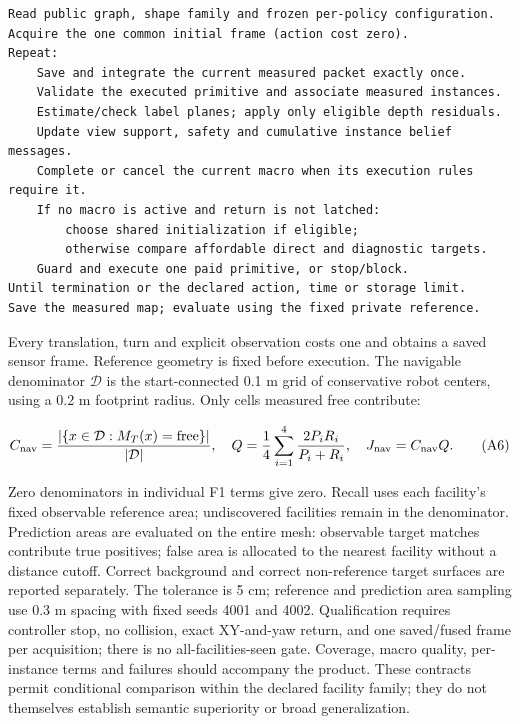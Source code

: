 \documentclass[11pt,a4paper]{article}
\begin{document}
\par\noindent\begin{minipage}{\linewidth}
\small
\begin{verbatim}
Read public graph, shape family and frozen per-policy configuration.
Acquire the one common initial frame (action cost zero).
Repeat:
    Save and integrate the current measured packet exactly once.
    Validate the executed primitive and associate measured instances.
    Estimate/check label planes; apply only eligible depth residuals.
    Update view support, safety and cumulative instance belief messages.
    Complete or cancel the current macro when its execution rules require it.
    If no macro is active and return is not latched:
        choose shared initialization if eligible;
        otherwise compare affordable direct and diagnostic targets.
    Guard and execute one paid primitive, or stop/block.
Until termination or the declared action, time or storage limit.
Save the measured map; evaluate using the fixed private reference.
\end{verbatim}
\end{minipage}\par

Every translation, turn and explicit observation costs one and obtains a saved sensor frame. Reference geometry is fixed before execution. The navigable denominator \(\mathcal D\) is the start-connected 0.1 m grid of conservative robot centers, using a 0.2 m footprint radius. Only cells measured free contribute:

\[
C_{\rm nav}=\frac{|\{x\in\mathcal D:M_T(x)=\text{free}\}|}{|\mathcal D|},\quad
Q=\frac14\sum_{i=1}^{4}\frac{2P_iR_i}{P_i+R_i},\quad
J_{\rm nav}=C_{\rm nav}Q.
\tag{A6}
\]

Zero denominators in individual F1 terms give zero. Recall uses each facility's fixed observable reference area; undiscovered facilities remain in the denominator. Prediction areas are evaluated on the entire mesh: observable target matches contribute true positives; false area is allocated to the nearest facility without a distance cutoff. Correct background and correct non-reference target surfaces are reported separately. The tolerance is 5 cm; reference and prediction area sampling use 0.3 m spacing with fixed seeds 4001 and 4002. Qualification requires controller stop, no collision, exact XY-and-yaw return, and one saved/fused frame per acquisition; there is no all-facilities-seen gate. Coverage, macro quality, per-instance terms and failures should accompany the product. These contracts permit conditional comparison within the declared facility family; they do not themselves establish semantic superiority or broad generalization.
\end{document}
